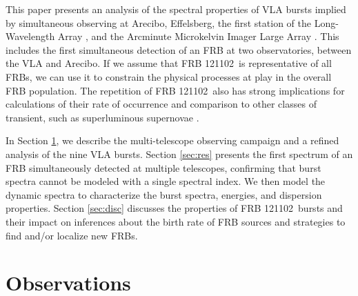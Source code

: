 \documentclass[twocolumn]{aastex61}
\newcommand{\frb}{FRB 121102}
\begin{document}
This paper presents an analysis of the spectral properties of VLA bursts implied by simultaneous observing at Arecibo, Effelsberg, the first station of the Long-Wavelength Array \citep[LWA1; ][]{2013ITAP...61.2540E}, and the Arcminute Microkelvin Imager Large Array \citep[AMI-LA; ][]{2008MNRAS.391.1545Z}. This includes the first simultaneous detection of an FRB at two observatories, between the VLA and Arecibo. If we assume that \frb\ is representative of all FRBs, we can use it to constrain the physical processes at play in the overall FRB population. The repetition of \frb\ also has strong implications for calculations of their rate of occurrence \citep{2016MNRAS.458L..89C} and comparison to other classes of transient, such as superluminous supernovae \citep{OPT}.

In Section \ref{sec:obs}, we describe the multi-telescope observing campaign and a refined analysis of the nine VLA bursts. Section \ref{sec:res} presents the first spectrum of an FRB simultaneously detected at multiple telescopes, confirming that burst spectra cannot be modeled with a single spectral index. We then model the dynamic spectra to characterize the burst spectra, energies, and dispersion properties. Section \ref{sec:disc} discusses the properties of \frb\ bursts and their impact on inferences about the birth rate of FRB sources and strategies to find and/or localize new FRBs.

\section{Observations}
\label{sec:obs}
\end{document}
